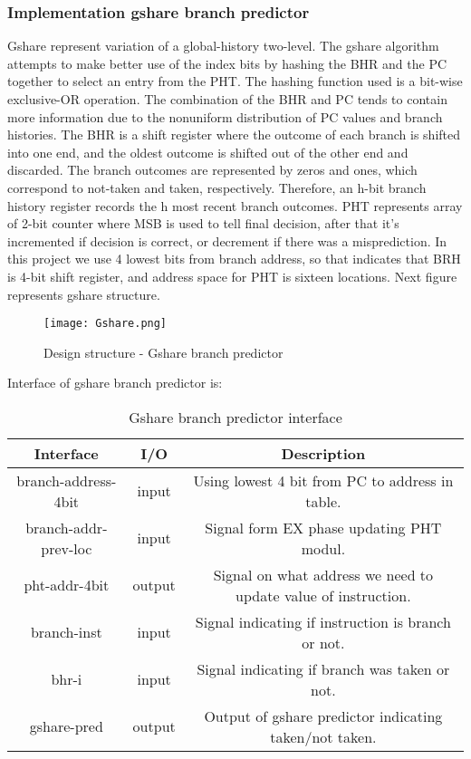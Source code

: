 \documentclass{scrreprt}
\begin{document}
\subsubsection*{Implementation gshare branch predictor}
Gshare represent variation of a global-history two-level. The gshare algorithm attempts to make better use of the index bits by hashing the BHR and the PC together to select an entry from the PHT. The hashing function used is a bit-wise exclusive-OR operation. The combination of the BHR and PC tends to contain more information due to the nonuniform distribution of PC values and branch histories.
The BHR is a shift register where the outcome of each branch is shifted into one end, and the oldest outcome is shifted out of the other end and discarded. The branch outcomes are represented by zeros and ones, which correspond to not-taken and taken, respectively. Therefore, an h-bit branch history register records the h most recent branch outcomes.
PHT represents array of 2-bit counter where MSB is used to tell final decision, after that it's incremented if decision is correct, or decrement if there was a misprediction.
In this project we use 4 lowest bits from branch address, so that indicates that BRH is 4-bit shift register, and address space for PHT is sixteen locations. 
\newline
Next figure represents gshare structure. 
\begin{figure}[htb!]
    \centering
    \texttt{[image: Gshare.png]}
    \caption{Design structure - Gshare branch predictor}
    \label{fig:Gshare}
\end{figure}
\newline
\newline
\newline
\newline
Interface of gshare branch predictor is:
\begin{table}[htb!]
            \centering
            \begin{tabular}{|c|c|c|} \hline 
             Interface & I/O & Description \\ \hline  
             branch-address-4bit & input & Using lowest 4 bit from PC to address in table. \\ \hline  
             branch-addr-prev-loc & input & Signal form EX phase updating PHT modul.  \\ \hline
             pht-addr-4bit & output & Signal on what address we need to update value of instruction.  \\ \hline
             branch-inst & input & Signal indicating if instruction is branch or not.  \\ \hline
             bhr-i & input & Signal indicating if branch was taken or not.  \\ \hline
             gshare-pred & output & Output of gshare predictor indicating taken/not taken.  \\ \hline
             
             
        \end{tabular}
        \caption{Gshare branch predictor interface}
        \label{tab:GshareI}
    \end{table}
\end{document}
